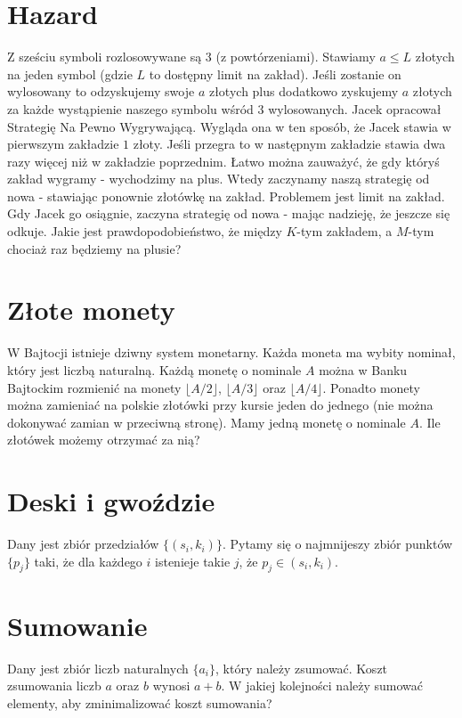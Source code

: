 \section*{Hazard}

Z sześciu symboli rozlosowywane są $3$ (z powtórzeniami).
Stawiamy $a \leq L$ złotych na jeden symbol (gdzie $L$ to dostępny limit na zakład).
Jeśli zostanie on wylosowany to odzyskujemy swoje $a$ złotych plus dodatkowo zyskujemy $a$ złotych za każde wystąpienie naszego symbolu wśród $3$ wylosowanych.
Jacek opracował Strategię Na Pewno Wygrywającą.
Wygląda ona w ten sposób, że Jacek stawia w pierwszym zakładzie $1$ złoty.
Jeśli przegra to w następnym zakładzie stawia dwa razy więcej niż w zakładzie poprzednim.
Łatwo można zauważyć, że gdy któryś zakład wygramy - wychodzimy na plus.
Wtedy zaczynamy naszą strategię od nowa - stawiając ponownie złotówkę na zakład.
Problemem jest limit na zakład.
Gdy Jacek go osiągnie, zaczyna strategię od nowa - mając nadzieję, że jeszcze się odkuje.
Jakie jest prawdopodobieństwo, że między $K$-tym zakładem, a $M$-tym chociaż raz będziemy na plusie?

\section*{Złote monety}

W Bajtocji istnieje dziwny system monetarny.
Każda moneta ma wybity nominał, który jest liczbą naturalną.
Każdą monetę o nominale $A$ można w Banku Bajtockim rozmienić na monety $\lfloor A / 2 \rfloor$, $\lfloor A / 3 \rfloor$ oraz $\lfloor A / 4 \rfloor$.
Ponadto monety można zamieniać na polskie złotówki przy kursie jeden do jednego (nie można dokonywać zamian w przeciwną stronę).
Mamy jedną monetę o nominale $A$.
Ile złotówek możemy otrzymać za nią?

\section*{Deski i gwoździe}

Dany jest zbiór przedziałów $\{(s_i, k_i)\}$.
Pytamy się o najmnijeszy zbiór punktów $\{p_j\}$ taki, że dla każdego $i$ istenieje takie $j$, że $p_j \in (s_i, k_i)$.

\section*{Sumowanie}

Dany jest zbiór liczb naturalnych $\{a_i\}$, który należy zsumować.
Koszt zsumowania liczb $a$ oraz $b$ wynosi $a + b$.
W jakiej kolejności należy sumować elementy, aby zminimalizować koszt sumowania?

